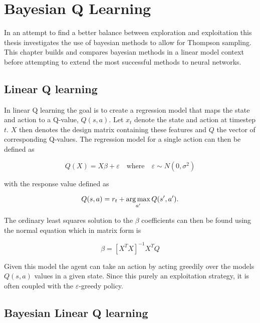 \chapter{Bayesian Q Learning}{\label{ch:bdqn}}

In an attempt to find a better balance between exploration and exploitation this thesis investigates the use of bayesian methods to allow for Thompson sampling. This chapter builds and compares bayesian methods in a linear model context before attempting to extend the most successful methods to neural networks.

\section{Linear Q learning}

In linear Q learning the goal is to create a regression model that maps the state and action to a Q-value, $Q(s,a)$. Let $x_t$ denote the state and action at timestep $t$. $X$ then denotes the design matrix containing these features and $Q$ the vector of corresponding Q-values. The regression model for a single action can then be defined as

\begin{equation*}
	Q(X) = X\beta + \varepsilon \quad \text{where} \quad \varepsilon \sim N(0,\sigma^2)
\end{equation*}

with the response value defined as 

\begin{equation}
    \label{eq:q_target}
	Q(s,a) = r_t + \operatorname*{arg\,max}_{a'}Q(s',a').
\end{equation}

The ordinary least squares solution to the $\beta$ coefficients can then be found using the normal equation which in matrix form is

\begin{equation*}
	\beta = [X^TX]^{-1}X^TQ
\end{equation*}

Given this model the agent can take an action by acting greedily over the models $Q(s,a)$ values in a given state. Since this purely an exploitation strategy, it is often coupled with the $\varepsilon$-greedy policy.

\section{Bayesian Linear Q learning}

